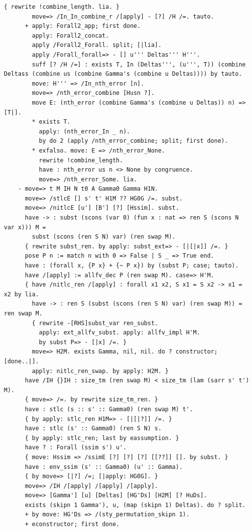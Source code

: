 \begin{lstlisting}[style=authorcoq]
        { rewrite !combine_length. lia. }
        move=> /In_In_combine_r /[apply] - [?] /H /=. tauto.
      + apply: Forall2_app; first done.
        apply: Forall2_concat.
        apply /Forall2_Forall. split; [|lia].
        apply /Forall_forall=> - [] u''' Deltas''' H'''.
        suff [? /H /=] : exists T, In (Deltas''', (u''', T)) (combine Deltass (combine us (combine Gamma's (combine u Deltas)))) by tauto.
        move: H''' => /In_nth_error [n].
        move=> /nth_error_combine [Husn ?].
        move E: (nth_error (combine Gamma's (combine u Deltas)) n) => [T|].
        * exists T.
          apply: (nth_error_In _ n).
          by do 2 (apply /nth_error_combine; split; first done).
        * exfalso. move: E => /nth_error_None.
          rewrite !combine_length.
          have : nth_error us n <> None by congruence.
          move=> /nth_error_Some. lia.
    - move=> t M IH N t0 A Gamma0 Gamma H1N.
      move=> /stlcE [] s' t' H1M ?? HG0G /=. subst.
      move=> /nitlcE [u'] [B'] [?] [Hssim]. subst.
      have -> : subst (scons (var 0) (fun x : nat => ren S (scons N var x))) M = 
        subst (scons (ren S N) var) (ren swap M).
      { rewrite subst_ren. by apply: subst_ext=> - [|[|x]] /=. }
      pose P n := match n with 0 => False | S _ => True end.
      have : (forall x, {P x} + {~ P x}) by (subst P; case; tauto).
      have /[apply] := allfv_dec P (ren swap M). case=> H'M.
      { have /nitlc_ren /[apply] : forall x1 x2, S x1 = S x2 -> x1 = x2 by lia.
        have -> : ren S (subst (scons (ren S N) var) (ren swap M)) = ren swap M.
        { rewrite -[RHS]subst_var ren_subst.
          apply: ext_allfv_subst. apply: allfv_impl H'M.
          by subst P=> - [|x] /=. }
        move=> H2M. exists Gamma, nil, nil. do ? constructor; [done..|].
        apply: nitlc_ren_swap. by apply: H2M. }
      have /IH {}IH : size_tm (ren swap M) < size_tm (lam (sarr s' t') M).
      { move=> /=. by rewrite size_tm_ren. }
      have : stlc (s :: s' :: Gamma0) (ren swap M) t'.
      { by apply: stlc_ren H1M=> - [|[|?]] /=. }
      have : stlc (s' :: Gamma0) (ren S N) s.
      { by apply: stlc_ren; last by eassumption. }
      have ? : Forall (ssim s') u'.
      { move: Hssim => /ssimE [?] [?] [?] [[??]] []. by subst. }
      have : env_ssim (s' :: Gamma0) (u' :: Gamma).
      { by move=> [|?] /=; [|apply: HG0G]. }
      move=> /IH /[apply] /[apply] /[apply].
      move=> [Gamma'] [u] [Deltas] [HG'Ds] [H2M] [? HuDs].
      exists (skipn 1 Gamma'), u, (map (skipn 1) Deltas). do ? split.
      + by move: HG'Ds => /(sty_permutation_skipn 1).
      + econstructor; first done.

\end{lstlisting}
